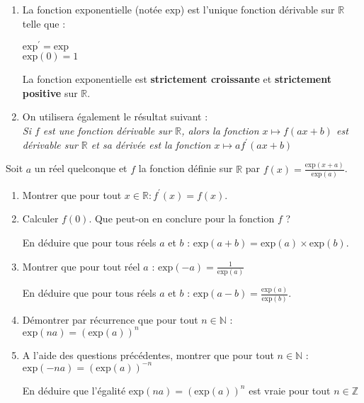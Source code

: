 
%


\begin{enumerate}[label=\alph*.]
     \item
     La fonction exponentielle (notée $\text{exp}$) est l'unique fonction dérivable sur $\mathbb{R}$ telle que :
     \par
     $\text{exp}^{\prime}=\text{exp}$
\\     
     $\text{exp}\left(0\right)=1$
     \par
     La fonction exponentielle est \textbf{strictement croissante} et \textbf{strictement positive} sur $\mathbb{R}$.
     \item
     On utilisera également le résultat suivant :
\\
     \textit{Si $f$ est une fonction dérivable sur $\mathbb{R}$, alors la fonction $x\mapsto f\left(ax+b\right)$ est dérivable sur $\mathbb{R}$ et sa dérivée est la fonction $x\mapsto af^{\prime}\left(ax+b\right)$}
\end{enumerate}
\bigskip
Soit $a$ un réel quelconque et $ f $ la fonction définie sur $\mathbb{R}$ par $f\left(x\right)=\frac{\text{exp}\left(x+a\right)}{\text{exp}\left(a\right)}$.
\begin{enumerate}
     \item
     Montrer que pour tout $x \in  \mathbb{R} : f^{\prime}\left(x\right)=f\left(x\right)$.
     \item
     Calculer $f\left(0\right)$. Que peut-on en conclure pour la fonction $f$ ?
     \par
     En déduire que pour tous réels $a$ et $b$ : $\text{exp}\left(a+b\right)=\text{exp}\left(a\right)\times \text{exp}\left(b\right)$.
     \item
     Montrer que pour tout réel $a$ : $\text{exp}\left(-a\right)=\frac{1}{\text{exp}\left(a\right)}$
     \par
     En déduire que pour tous réels $a$ et $b$ : $\text{exp}\left(a-b\right)=\frac{\text{exp}\left(a\right)}{\text{exp}\left(b\right)}$.
     \item
     Démontrer par récurrence que pour tout $n \in  \mathbb{N}$ :
\\
     $\text{exp}\left(na\right) = \left(\text{exp}\left(a\right)\right)^{n}$
     \item
     A l'aide des questions précédentes, montrer que pour tout $n \in  \mathbb{N}$ :
\\
     $\text{exp}\left(-na\right) = \left(\text{exp}\left(a\right)\right)^{-n}$
     \par
     En déduire que l'égalité $\text{exp}\left(na\right) = \left(\text{exp}\left(a\right)\right)^{n}$ est vraie pour tout $n \in  \mathbb{Z}$
\end{enumerate}
